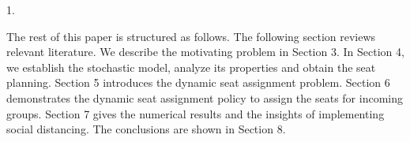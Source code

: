 


1. 

The rest of this paper is structured as follows. The following section reviews relevant literature. We describe the motivating problem in Section 3. In Section 4, we establish the stochastic model, analyze its properties and obtain the seat planning. Section 5 introduces the dynamic seat assignment problem.
Section 6 demonstrates the dynamic seat assignment policy to assign the seats for incoming groups. Section 7 gives the numerical results and the insights of implementing social distancing. The conclusions are shown in Section 8.
\newpage
